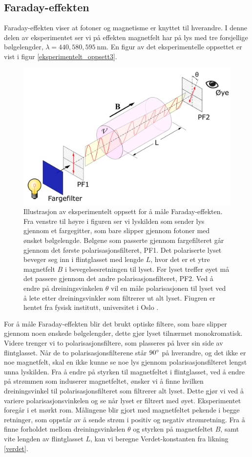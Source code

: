 \documentclass[%
 reprint,
 amsmath,amssymb,
 aps,
 norsk,
]{revtex4-1}
\begin{document}
\subsection{Faraday-effekten}
Faraday-effekten viser at fotoner og magnetisme er knyttet til hverandre. I denne delen av eksperimentet ser vi på effekten magnetfelt har på lys med tre forsjellige bølgelengder, $\lambda = 440, 580, \SI{595}{\nano\meter}$. En figur av det eksperimentelle oppsettet er vist i figur \vref{eksperimentelt_oppsett3}.
\begin{figure}[h!]
  \centering
  \includegraphics[scale=0.27]{oppsett3.png}
  \caption{Illustrasjon av eksperimentelt oppsett for å måle Faraday-effekten. Fra venstre til høyre i figuren ser vi lyskilden som sender lys gjennom et fargegitter, som bare slipper gjennom fotoner med ønsket bølgelengde. Bølgene som passerte gjennom fargefilteret går gjennom det første polarisasjonsfilteret, PF1. Det polariserte lyset beveger seg inn i flintglasset med lengde $L$, hvor det er et ytre magnetfelt $B$ i bevegelsesretningen til lyset. Før lyset treffer øyet må det passere gjennom det andre polarisasjonsfilteret, PF2. Ved å endre på dreiningsvinkelen $\theta$ vil en måle polarisasjonen til lyset ved å lete etter dreiningsvinkler som filtrerer ut alt lyset. Fiugren er hentet fra fysisk institutt, universitet i Oslo \cite{oppgave}.}
  \label{eksperimentelt_oppsett3}
\end{figure}
For å måle Faraday-effekten blir det brukt optiske filtere, som bare slipper gjennom noen ønskede bølgelengder, dette gjør lyset tilnærmet monokromatisk. Videre trenger vi to polarisasjonsfiltere, som plasseres på hver sin side av flintglasset. Når de to polarisasjonsfilterene står $90\degree$ på hverandre, og det ikke er noe magnetfelt, skal en ikke kunne se noe lys gjennom polarisasjonsfilteret lengst unna lyskilden. Fra å endre på styrken til magnetfeltet i flintglasset, ved å endre på strømmen som induserer magnetfeltet, ønsker vi å finne hvilken dreiningsvinkel til polarisasjonsfilteret som filtrerer alt lyset. Dette gjør vi ved å variere polarisasjonsvinkelen og se når lyset er filtrert med øyet. Eksperimentet foregår i et mørkt rom. Målingene blir gjort med magnetfeltet pekende i begge retninger, som oppstår av å sende strøm i positiv og negativ strømretning. Fra å finne forholdet mellom dreiningsvinkelen $\theta$ og styrken på magnetfeltet $B$, samt vite lengden av flintglasset $L$, kan vi beregne Verdet-konstanten fra likning \eqref{verdet}.
\end{document}
